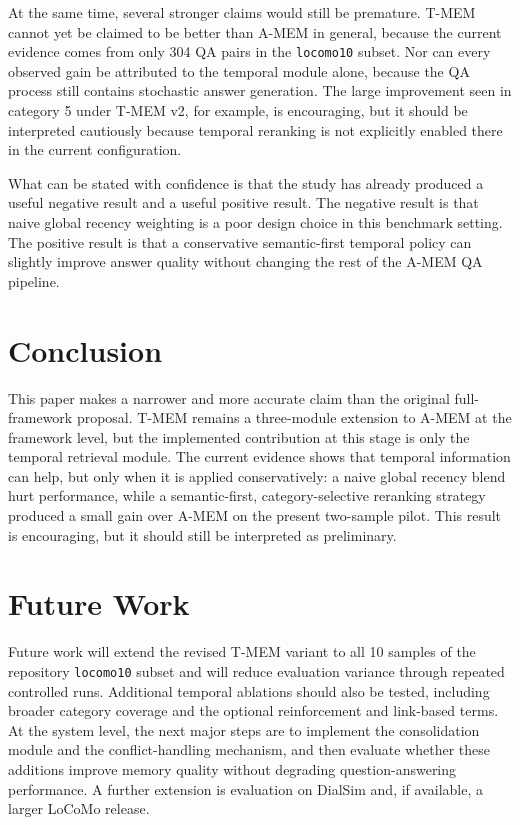 \documentclass[conference]{IEEEtran}
\begin{document}
At the same time, several stronger claims would still be premature. T-MEM cannot yet be claimed to be better than A-MEM in general, because the current evidence comes from only 304 QA pairs in the \texttt{locomo10} subset. Nor can every observed gain be attributed to the temporal module alone, because the QA process still contains stochastic answer generation. The large improvement seen in category 5 under T-MEM v2, for example, is encouraging, but it should be interpreted cautiously because temporal reranking is not explicitly enabled there in the current configuration.

What can be stated with confidence is that the study has already produced a useful negative result and a useful positive result. The negative result is that naive global recency weighting is a poor design choice in this benchmark setting. The positive result is that a conservative semantic-first temporal policy can slightly improve answer quality without changing the rest of the A-MEM QA pipeline.

\section{Conclusion}

This paper makes a narrower and more accurate claim than the original full-framework proposal. T-MEM remains a three-module extension to A-MEM at the framework level, but the implemented contribution at this stage is only the temporal retrieval module. The current evidence shows that temporal information can help, but only when it is applied conservatively: a naive global recency blend hurt performance, while a semantic-first, category-selective reranking strategy produced a small gain over A-MEM on the present two-sample pilot. This result is encouraging, but it should still be interpreted as preliminary.

\section{Future Work}

Future work will extend the revised T-MEM variant to all 10 samples of the repository \texttt{locomo10} subset and will reduce evaluation variance through repeated controlled runs. Additional temporal ablations should also be tested, including broader category coverage and the optional reinforcement and link-based terms. At the system level, the next major steps are to implement the consolidation module and the conflict-handling mechanism, and then evaluate whether these additions improve memory quality without degrading question-answering performance. A further extension is evaluation on DialSim and, if available, a larger LoCoMo release.
\end{document}
